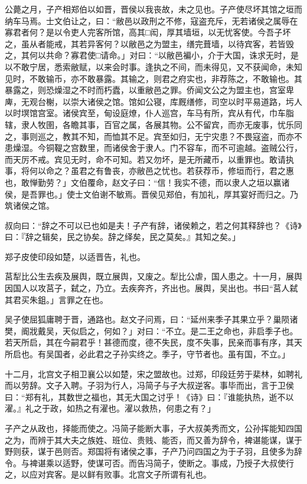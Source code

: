 \documentclass[]{article}
\begin{document}
公薨之月，子产相郑伯以如晋，晋侯以我丧故，未之见也。子产使尽坏其馆之垣而纳车马焉。士文伯让之，曰：``敝邑以政刑之不修，寇盗充斥，无若诸侯之属辱在寡君者何？是以令吏人完客所馆，高其□闳，厚其墙垣，以无忧客使。今吾子坏之，虽从者能戒，其若异客何？以敝邑之为盟主，缮完葺墙，以待宾客，若皆毁之，其何以共命？寡君使□请命。」对曰：``以敝邑褊小，介于大国，诛求无时，是以不敢宁居，悉索敝赋，以来会时事。逢执之不间，而未得见，又不获闻命，未知见时，不敢输币，亦不敢暴露。其输之，则君之府实也，非荐陈之，不敢输也。其暴露之，则恐燥湿之不时而朽蠹，以重敝邑之罪。侨闻文公之为盟主也，宫室卑庳，无观台榭，以崇大诸侯之馆。馆如公寝，库厩缮修，司空以时平易道路，圬人以时塓馆宫室。诸侯宾至，甸设庭燎，仆人巡宫，车马有所，宾从有代，巾车脂辖，隶人牧圉，各瞻其事，百官之属，各展其物。公不留宾，而亦无废事，忧乐同之，事则巡之，教其不知，而恤其不足。宾至如归，无宁灾患？不畏寇盗，而亦不患燥湿。今铜鞮之宫数里，而诸侯舍于隶人。门不容车，而不可逾越。盗贼公行，而天厉不戒。宾见无时，命不可知。若又勿坏，是无所藏币，以重罪也。敢请执事，将何以命之？虽君之有鲁丧，亦敝邑之忧也。若获荐币，修垣而行，君之惠也，敢惮勤劳？」文伯覆命，赵文子曰：``信！我实不德，而以隶人之垣以赢诸侯，是吾罪也。」使士文伯谢不敏焉。晋侯见郑伯，有加礼，厚其宴好而归之。乃筑诸侯之馆。

叔向曰：``辞之不可以已也如是夫！子产有辞，诸侯赖之，若之何其释辞也？《诗》曰：『辞之辑矣，民之协矣。辞之绎矣，民之莫矣。』其知之矣。」

郑子皮使印段如楚，以适晋告，礼也。

莒犁比公生去疾及展舆，既立展舆，又废之。犁比公虐，国人患之。十一月，展舆因国人以攻莒子，弑之，乃立。去疾奔齐，齐出也。展舆，吴出也。书曰``莒人弑其君买朱鉏。」言罪之在也。

吴子使屈狐庸聘于晋，通路也。赵文子问焉，曰：``延州来季子其果立乎？巢陨诸樊，阍戕戴吴，天似启之，何如？」对曰：``不立。是二王之命也，非启季子也。若天所启，其在今嗣君乎！甚德而度，德不失民，度不失事，民亲而事有序，其天所启也。有吴国者，必此君之子孙实终之。季子，守节者也。虽有国，不立。」

十二月，北宫文子相卫襄公以如楚，宋之盟故也。过郑，印段廷劳于棐林，如聘礼而以劳辞。文子入聘。子羽为行人，冯简子与子大叔逆客。事毕而出，言于卫侯曰：``郑有礼，其数世之福也，其无大国之讨乎！《诗》曰：『谁能执热，逝不以濯。』礼之于政，如热之有濯也。濯以救热，何患之有？」

子产之从政也，择能而使之。冯简子能断大事，子大叔美秀而文，公孙挥能知四国之为，而辨于其大夫之族姓、班位、贵贱、能否，而又善为辞令，裨谌能谋，谋于野则获，谋于邑则否。郑国将有诸侯之事，子产乃问四国之为于子羽，且使多为辞令。与裨谌乘以适野，使谋可否。而告冯简子，使断之。事成，乃授子大叔使行之，以应对宾客。是以鲜有败事。北宫文子所谓有礼也。
\end{document}
